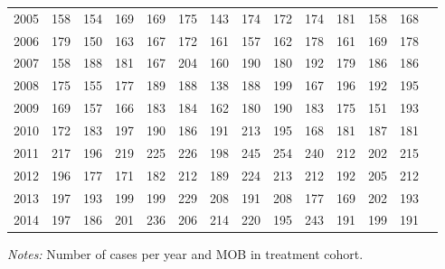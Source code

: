 \begin{table}[H]
\begin{threeparttable}
{\begin{tabular}{l*{13}{c}}
2005        &         158&         154&         169&         169&         175&         143&         174&         172&         174&         181&         158&         168\\
2006        &         179&         150&         163&         167&         172&         161&         157&         162&         178&         161&         169&         178\\
2007        &         158&         188&         181&         167&         204&         160&         190&         180&         192&         179&         186&         186\\
2008        &         175&         155&         177&         189&         188&         138&         188&         199&         167&         196&         192&         195\\
2009        &         169&         157&         166&         183&         184&         162&         180&         190&         183&         175&         151&         193\\
2010        &         172&         183&         197&         190&         186&         191&         213&         195&         168&         181&         187&         181\\
2011        &         217&         196&         219&         225&         226&         198&         245&         254&         240&         212&         202&         215\\
2012        &         196&         177&         171&         182&         212&         189&         224&         213&         212&         192&         205&         212\\
2013        &         197&         193&         199&         199&         229&         208&         191&         208&         177&         169&         202&         193\\
2014        &         197&         186&         201&         236&         206&         214&         220&         195&         243&         191&         199&         191\\
 \bottomrule \end{tabular} } \begin{tablenotes} \item \scriptsize \emph{Notes:} Number of cases per year and MOB in treatment cohort. \end{tablenotes} \end{threeparttable} \end{table} 
